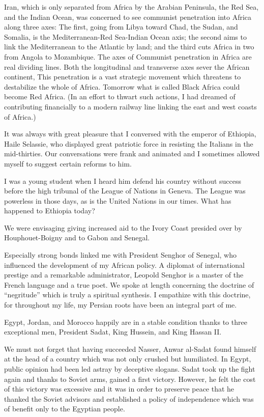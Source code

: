 Iran, which is only separated from Africa by the Arabian Peninsula, the Red Sea, and the Indian Ocean, was concerned to see communist penetration into Africa along three axes: The first, going from Libya toward Chad, the Sudan, and Somalia, is the Mediterranean-Red Sea-Indian Ocean axis; the second aims to link the Mediterranean to the Atlantic by land; and the third cuts Africa in two from Angola to Mozambique. The axes of Communist penetration in Africa are real dividing lines. Both the longitudinal and transverse axes sever the African continent, This penetration is a vast strategic movement which threatens to destabilize the whole of Africa. Tomorrow what is called Black Africa could become Red Africa. (In an effort to thwart such actions, I had dreamed of contributing financially to a modern railway line linking the east and west coasts of Africa.) 


It was always with great pleasure that I conversed with the emperor of Ethiopia, Haile Selassie, who displayed great patriotic force in resisting the Italians in the mid-thirties. Our conversations were frank and animated and I sometimes allowed myself to suggest certain reforms to him. 

I was a young student when I heard him defend his country without success before the high tribunal of the League of Nations in Geneva. The League was powerless in those days, as is the United Nations in our times. What has happened to Ethiopia today? 

We were envisaging giving increased aid to the Ivory Coast presided over by Houphouet-Boigny and to Gabon and Senegal. 

Especially strong bonds linked me with President Senghor of Senegal, who influenced the development of my African policy. A diplomat of international prestige and a remarkable administrator, Leopold Senghor is a master of the French language and a true poet. We spoke at length concerning the doctrine of “negritude” which is truly a spiritual synthesis. I empathize with this doctrine, for throughout my life, my Persian roots have been an integral part of me. 


Egypt, Jordan, and Morocco happily are in a stable condition thanks to three exceptional men, President Sadat, King Hussein, and King Hassan II. 

We must not forget that having succeeded Nasser, Anwar al-Sadat found himself at the head of a country which was not only crushed but humiliated. In Egypt, public opinion had been led astray by deceptive slogans. Sadat took up the fight again and thanks to Soviet arms, gained a first victory. However, he felt the cost of this victory was excessive and it was in order to preserve peace that he thanked the Soviet advisors and established a policy of independence which was of benefit only to the Egyptian people. 

